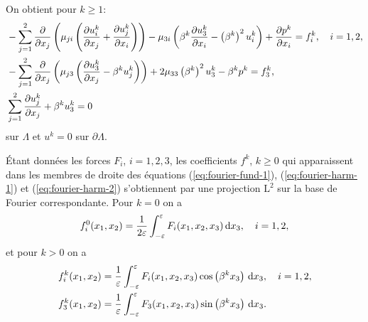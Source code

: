 On obtient pour $k
\geq 1$:
\begin{align}
  &-\sum_{j = 1}^2\frac{\partial}{\partial
    x_j}\left( \mu_{ji}\left( \frac{\partial u_i^k}{\partial x_j} +
      \frac{\partial u_j^k}{\partial x_i} \right) \right) -
  \mu_{3i}\left( \beta^k\frac{\partial u_3^k}{\partial x_i} -
    \left( \beta^k \right)^2 u_i^k \right) + \frac{\partial p^k}{\partial x_i} = f_i^k,\quad
  i = 1,2,\label{eq:fourier-harm-1}\\
  &-\sum_{j = 1}^2\frac{\partial}{\partial
    x_j}\left( \mu_{j3}\left( \frac{\partial u_3^k}{\partial x_j} -
      \beta^k u_j^k \right) \right) + 2\mu_{33}\left( \beta^k \right)^2 u_3^k - \beta^k p^k =
  f_3^k,\label{eq:fourier-harm-2}\\
  &\sum_{j = 1}^2\frac{\partial u_j^k}{\partial x_j} + \beta^k u_3^k = 0\label{eq:fourier-harm-3}
\end{align}
sur $\Lambda$ et $u^k = 0$ sur $\partial \Lambda$.

Étant données les forces $F_i$, $i = 1,2,3$, les coefficients $f^k$,
$k \geq 0$ qui apparaissent dans les membres de droite des équations
(\ref{eq:fourier-fund-1}), (\ref{eq:fourier-harm-1}) et
(\ref{eq:fourier-harm-2}) s'obtiennent par une projection $\mathrm
L^2$ sur la base de Fourier correspondante. Pour $k = 0$ on a
\begin{align}
  f_i^0(x_1, x_2) =
  \frac{1}{2\varepsilon}\int_{-\varepsilon}^{\varepsilon}F_i(x_1, x_2, x_3)\,\mathrm
  dx_3, \quad i = 1,2,\label{eq:f-1}
\end{align}
et pour $k > 0$ on a
\begin{align}
&f_i^k(x_1, x_2) =
\frac{1}{\varepsilon}\int_{-\varepsilon}^{\varepsilon}F_i(x_1, x_2,
x_3)\cos\left( \beta^k x_3 \right)\,\mathrm dx_3,\quad i = 1,2,\label{eq:f-2}\\
&f_3^k(x_1, x_2) = \frac{1}{\varepsilon}\int_{-\varepsilon}^{\varepsilon}
F_3(x_1, x_2,x_3) \sin\left( \beta^k x_3 \right)\,\mathrm dx_3.\label{eq:f-3}
\end{align}



